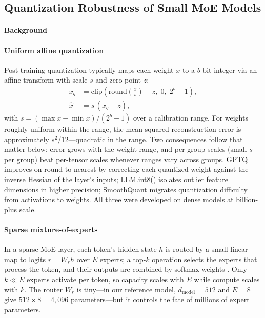 \subsection{Quantization Robustness of Small MoE Models}
\label{ch-quant}

\paragraph{Background}

\paragraph{Uniform affine quantization}

Post-training quantization typically maps each weight $x$ to a $b$-bit
integer via an affine transform with scale $s$ and zero-point $z$:
{\small
\begin{equation}
\begin{aligned}
x_q &= \mathrm{clip}\!\left(\mathrm{round}\!\left(\frac{x}{s}\right) + z,
\; 0, \; 2^b - 1\right), \\
\hat{x} &= s\,(x_q - z),
\end{aligned}
\end{equation}}
with $s = (\max x - \min x)/(2^b - 1)$ over a calibration range. For
weights roughly uniform within the range, the mean squared
reconstruction error is approximately $s^2/12$---quadratic in the
range. Two consequences follow that matter below: error grows with the
weight range, and per-group scales (small $s$ per group) beat
per-tensor scales whenever ranges vary across groups. GPTQ
\citep{frantar2023gptq} improves on round-to-nearest by correcting each
quantized weight against the inverse Hessian of the layer's inputs;
LLM.int8() \citep{dettmers2022llm} isolates outlier feature dimensions
in higher precision; SmoothQuant \citep{xiao2023smoothquant} migrates
quantization difficulty from activations to weights. All three were
developed on dense models at billion-plus scale.

\paragraph{Sparse mixture-of-experts}

In a sparse MoE layer, each token's hidden state $h$ is routed by a
small linear map to logits $r = W_r h$ over $E$ experts; a top-$k$
operation selects the experts that process the token, and their outputs
are combined by softmax weights \citep{shazeer2017moe}. Only $k \ll E$
experts activate per token, so capacity scales with $E$ while compute
scales with $k$. The router $W_r$ is tiny---in our reference model,
$d_{\text{model}} = 512$ and $E = 8$ give $512 \times 8 = 4{,}096$
parameters---but it controls the fate of millions of expert parameters.

